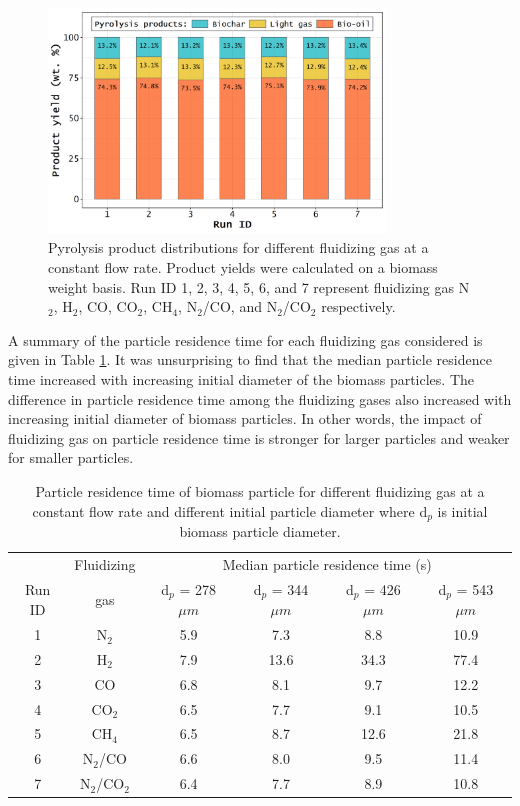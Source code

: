 \begin{figure}[H]
    \centering
    \includegraphics[width=0.8\textwidth]{figures/cfd-product-yield.pdf}
    \caption{Pyrolysis product distributions for different fluidizing gas at a constant flow rate. Product yields were calculated on a biomass weight basis. Run ID 1, 2, 3, 4, 5, 6, and 7 represent fluidizing gas N$_2$, H$_2$, CO, CO$_2$, CH$_4$, N$_2$/CO, and N$_2$/CO$_2$ respectively.}
    \label{fig:cfd-product-yield}
\end{figure}

A summary of the particle residence time for each fluidizing gas considered is given in Table \ref{tab:particle-restime}. It was unsurprising to find that the median particle residence time increased with increasing initial diameter of the biomass particles. The difference in particle residence time among the fluidizing gases also increased with increasing initial diameter of biomass particles. In other words, the impact of fluidizing gas on particle residence time is stronger for larger particles and weaker for smaller particles.

\begin{table}[H]
    \centering
    \caption{Particle residence time of biomass particle for different fluidizing gas at a constant flow rate and different initial particle diameter where d$_p$ is initial biomass particle diameter.}
    \label{tab:particle-restime}
    \begin{tabular}{cccccc}
        \toprule
               & Fluidizing & \multicolumn{4}{c}{Median particle residence time (s)} \\
        Run ID & gas        & d$_p$ = 278 $\mu m$ & d$_p$ = 344 $\mu m$ & d$_p$ = 426 $\mu m$ & d$_p$ = 543 $\mu m$ \\
        \midrule
        1 & N$_2$        & 5.9 & 7.3  & 8.8  & 10.9 \\
        2 & H$_2$        & 7.9 & 13.6 & 34.3 & 77.4 \\
        3 & CO           & 6.8 & 8.1  & 9.7  & 12.2 \\
        4 & CO$_2$       & 6.5 & 7.7  & 9.1  & 10.5 \\
        5 & CH$_4$       & 6.5 & 8.7  & 12.6 & 21.8 \\
        6 & N$_2$/CO     & 6.6 & 8.0  & 9.5  & 11.4 \\
        7 & N$_2$/CO$_2$ & 6.4 & 7.7  & 8.9  & 10.8 \\
        \bottomrule
    \end{tabular}
\end{table}

